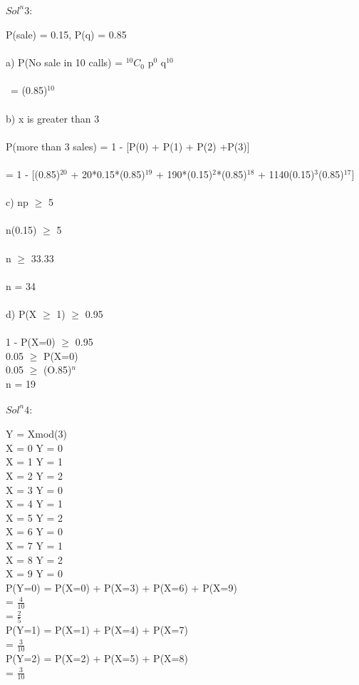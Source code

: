 \documentclass{article}
\begin{document}
\textbf{$Sol^n 3:$} \\\\
P(sale) = 0.15, P(q) = 0.85 \\\\
a) P(No sale in 10 calls) = $^10C_0$ p$^0$ q$^10$ \\\\\
= (0.85)$^10$ \\\\
b) x is greater than 3\\\\
P(more than 3 sales) = 1 - [P(0) + P(1) + P(2) +P(3)]\\\\
= 1 - [(0.85)$^20$ + 20*0.15*(0.85)$^19$ + 190*(0.15)$^2$*(0.85)$^18$ + 1140(0.15)$^3$(0.85)$^17$]\\\\
c) np $\geq$ 5\\\\
n(0.15) $\geq$ 5\\\\
n $\geq$ 33.33\\\\
n = 34 \\\\
d) P(X $\geq$ 1) $\geq$ 0.95\\\\
1 - P(X=0) $\geq$ 0.95\\
0.05 $\geq$ P(X=0) \\
0.05 $\geq$ (O.85)$^n$\\
n = 19\\\\

\textbf{$Sol^n 4:$} \\\\
Y = Xmod(3)\\
X = 0  Y = 0\\
X = 1  Y = 1\\
X = 2  Y = 2\\
X = 3  Y = 0\\
X = 4  Y = 1\\
X = 5  Y = 2\\
X = 6  Y = 0\\
X = 7  Y = 1\\
X = 8  Y = 2\\
X = 9  Y = 0\\
P(Y=0) = P(X=0) + P(X=3) + P(X=6) + P(X=9)\\
       = $\frac{4}{10}$\\
       = $\frac{2}{5}$\\
P(Y=1) = P(X=1) + P(X=4) + P(X=7) \\
       = $\frac{3}{10}$\\
P(Y=2) = P(X=2) + P(X=5) + P(X=8)\\
       = $\frac{3}{10}$\\\\
       
\end{document}
